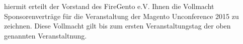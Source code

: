 \documentclass[ngerman]{g-brief}
\begin{document}
\begin{g-brief}
hiermit erteilt der Vorstand des FireGento e.V. Ihnen die Vollmacht Sponsorenverträge für die Veranstaltung der Magento Unconference 2015 zu zeichnen. Diese Vollmacht gilt bis zum ersten Veranstaltungstag der oben genannten Veranstaltnung.
\end{g-brief}
\end{document}
